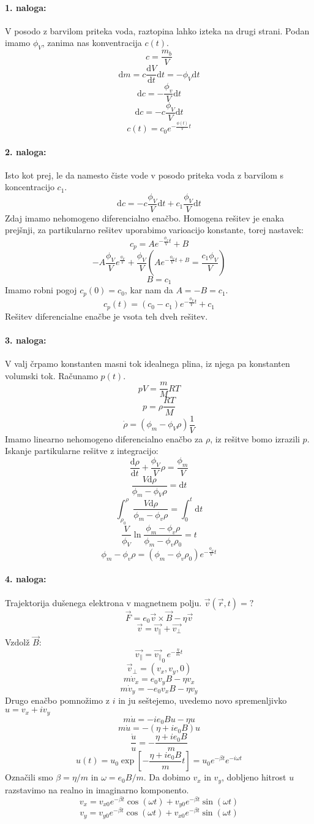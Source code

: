 \documentclass[a4paper]{article}
\newcommand{\vct}[1]{\overrightarrow{#1}}
\newcommand{\dif}{\mathrm{d}}
\newcommand{\dd}[2]{\frac{\mathrm{d} {#1}}{\mathrm{d} {#2}}}
\begin{document}
\paragraph{1. naloga:} V posodo z barvilom priteka voda, raztopina lahko izteka na drugi strani. Podan imamo $\phi_V$, zanima nas konventracija $c(t)$.
$$c = \frac{m_b}{V}$$
$$\dif m = c \dd{V}{t} \dif t = - \phi_V \dif t$$
$$\dif c = -\frac{\phi_v}{V}\dif t$$
$$\dif c = - c \frac{\phi_V}{V}\dif t$$
$$c(t) = c_0 e^{-\frac{\phi(t)}{V}t}$$
\paragraph{2. naloga:} Isto kot prej, le da namesto čiste vode v posodo priteka voda z barvilom s koncentracijo $c_1$.
$$\dif c = - c\frac{\phi_V}{V} \dif t + c_1\frac{\phi_V}{V}\dif t$$
Zdaj imamo nehomogeno diferencialno enačbo. Homogena rešitev je enaka prejšnji, za partikularno rešitev uporabimo varioacijo konstante, torej nastavek:
$$c_p = Ae^{-\frac{\phi_v}{V}t} + B$$
$$-A\frac{\phi_V}{V}e^{\frac{\phi_V}{V}} + \frac{\phi_V}{V}\left(Ae^{-\frac{\phi_V}{V}t + B} = \frac{c_1\phi_V}{V}\right)$$
$$B = c_1$$
Imamo robni pogoj $c_p(0) = c_0$, kar nam da $A = -B = c_1$.
$$c_p(t) = (c_0 - c_1)e^{-\frac{\phi_V}{V}t} + c_1$$
Rešitev diferencialne enačbe je vsota teh dveh rešitev.
\paragraph{3. naloga:} V valj črpamo konstanten masni tok idealnega plina, iz njega pa konstanten volumski tok. Računamo $p(t)$.
$$pV = \frac{m}{M}RT$$
$$p = \rho \frac{RT}{M}$$
$$\dot\rho = \left(\phi_m - \phi_V\rho\right) \frac{1}{V}$$
Imamo linearno nehomogeno diferencialno enačbo za $\rho$, iz rešitve bomo izrazili $p$.
Iskanje partikularne rešitve z integracijo:
$$\dd{\rho}{t} + \frac{\phi_V}{V}\rho = \frac{\phi_m}{V}$$
$$\frac{V \dif \rho}{\phi_m - \phi_V\rho} = \dif t$$
$$\int_{\rho_0}^{\rho} \frac{V\dif\rho}{\phi_m-\phi_v\rho} = \int_{0}^{t}\dif t$$
$$\frac{V}{\phi_V}\ln\frac{\phi_m - \phi_v\rho}{\phi_m - \phi_v\rho_0} = t$$
$$\phi_m - \phi_v\rho = (\phi_m - \phi_v\rho_0)e^{-\frac{\phi_V}{V}t}$$
\paragraph{4. naloga:} Trajektorija dušenega elektrona v magnetnem polju. $\vct{v}(\vct{r}, t) = ?$
$$\vct{F} = e_0\vct{v}\times\vct{B} - \eta\vct{v}$$
$$\vct{v} = \vct{v_\parallel} + \vct{v_\perp}$$
Vzdolž $\vct{B}$:
$$\vct{v_\parallel} = \vct{v_\parallel}_0\, e^{-\frac{\eta}{m} t}$$
$$\vct{v}_\perp = (v_x, v_y, 0)$$
$$m\dot{v}_x = e_0v_yB-\eta v_x$$
$$m \dot{v}_y = -e_0v_xB - \eta v_y$$
Drugo enačbo pomnožimo z $i$ in ju seštejemo, uvedemo novo spremenljivko $u = v_x + iv_y$
$$m \dot u = -ie_0Bu - \eta u$$
$$m\dot u = - (\eta + ie_0B) u$$
$$\frac{\dot u}{u} = - \frac{\eta + ie_0B}{m}$$
$$u(t) = u_0\exp\left[-\frac{\eta + ie_0B}{m}t\right] = u_0e^{-\beta t} e^{-i\omega t}$$
Označili smo $\beta = \eta/m$ in $\omega = e_0B/m$.
Da dobimo $v_x$ in $v_y$, dobljeno hitrost $u$ razstavimo na realno in imaginarno komponento.
$$v_x = v_{x0} e^{-\beta t} \cos(\omega t) + v_{y0} e^{-\beta t} \sin(\omega t)$$
$$v_y = v_{y0} e^{-\beta t} \cos(\omega t) + v_{x0} e^{-\beta t} \sin(\omega t)$$
\end{document}
